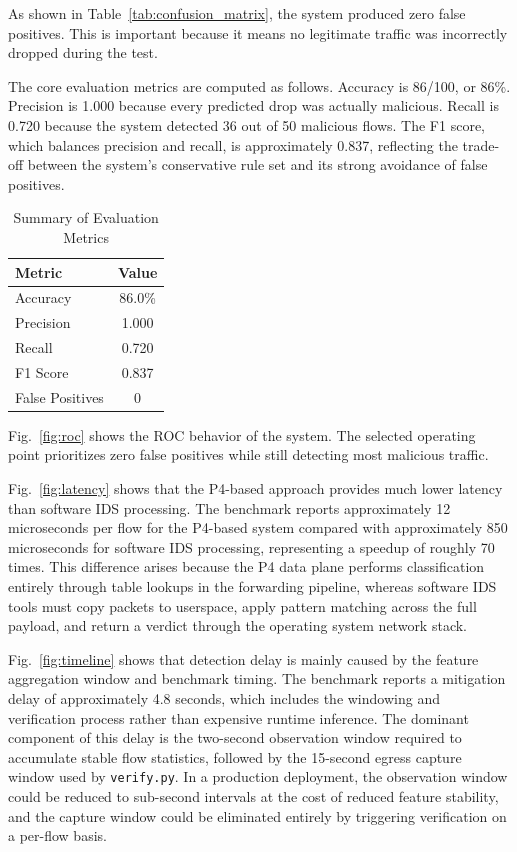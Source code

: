 \documentclass[conference]{IEEEtran}
\begin{document}
As shown in Table~\ref{tab:confusion_matrix}, the system produced zero false
positives. This is important because it means no legitimate
traffic was incorrectly dropped during the test.

The core evaluation metrics are computed as follows.
Accuracy is 86/100, or 86\%. Precision is 1.000 because
every predicted drop was actually malicious. Recall is 0.720
because the system detected 36 out of 50 malicious flows.
The F1 score, which balances precision and recall, is
approximately 0.837, reflecting the trade-off between the
system's conservative rule set and its strong avoidance of
false positives.

\begin{table}[H]
\caption{Summary of Evaluation Metrics}
\label{tab:metrics}
\centering
\begin{tabular}{lc}
\toprule
\textbf{Metric} & \textbf{Value} \\
\midrule
Accuracy  & 86.0\% \\
Precision & 1.000 \\
Recall    & 0.720 \\
F1 Score  & 0.837 \\
False Positives & 0 \\
\bottomrule
\end{tabular}
\end{table}

Fig.~\ref{fig:roc} shows the ROC behavior of the system. The selected
operating point prioritizes zero false positives while still
detecting most malicious traffic.

Fig.~\ref{fig:latency} shows that the P4-based approach provides much
lower latency than software IDS processing. The benchmark
reports approximately 12 microseconds per flow for the
P4-based system compared with approximately 850 microseconds
for software IDS processing, representing a speedup of
roughly 70 times. This difference arises because the P4
data plane performs classification entirely through table
lookups in the forwarding pipeline, whereas software IDS
tools must copy packets to userspace, apply pattern matching
across the full payload, and return a verdict through the
operating system network stack.

Fig.~\ref{fig:timeline} shows that detection delay is mainly caused by
the feature aggregation window and benchmark timing. The
benchmark reports a mitigation delay of approximately 4.8
seconds, which includes the windowing and verification
process rather than expensive runtime inference. The dominant
component of this delay is the two-second observation window
required to accumulate stable flow statistics, followed by
the 15-second egress capture window used by \texttt{verify.py}.
In a production deployment, the observation window could be
reduced to sub-second intervals at the cost of reduced feature
stability, and the capture window could be eliminated entirely
by triggering verification on a per-flow basis.
\end{document}
